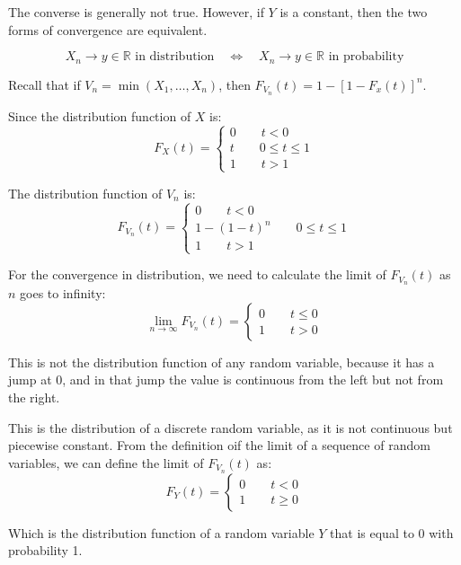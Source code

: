 The converse is generally not true. However, if $Y$ is a constant, then the two forms of convergence are equivalent.

\[
X_n \to y \in \mathbb{R} \text{ in distribution} \quad \Leftrightarrow \quad X_n \to y \in \mathbb{R} \text{ in probability}
\]


Recall that if $V_n = \min(X_1, \ldots , X_n)$, then $F_{V_n}(t) = 1- [1-F_x(t)]^n.$ 

Since the distribution function of $X$ is:
\[
F_X(t) = \begin{cases}
    0 \qquad t < 0 \\
    t \qquad 0 \leq t \leq 1 \\
    1 \qquad t > 1
\end{cases}
\]

The distribution function of $V_n$ is:
\[
F_{V_n}(t) = \begin{cases}
    0 \qquad t < 0 \\
    1 - (1-t)^n \qquad 0 \leq t \leq 1 \\
    1 \qquad t > 1
\end{cases}
\]

For the convergence in distribution, we need to calculate the limit of $F_{V_n}(t)$ as $n$ goes to infinity:
\[
\lim_{n \to \infty} F_{V_n}(t) = \begin{cases}
    0 \qquad t \leq 0 \\
    1 \qquad t > 0
\end{cases}
\]

This is not the distribution function of any random variable, because it has a jump at 0, and in that jump the value is continuous from the left but not from the right.

This is the distribution of a discrete random variable, as it is not continuous but piecewise constant.
From the definition oif the limit of a sequence of random variables, we can define the limit of $F_{V_n}(t)$ as:
\[
F_Y(t) = \begin{cases}
    0 \qquad t < 0 \\
    1 \qquad t \geq 0
\end{cases}
\]

Which is the distribution function of a random variable $Y$ that is equal to 0 with probability 1.

